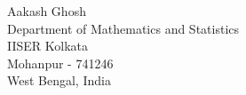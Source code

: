 \documentclass[a4paper, 10pt]{article}
\begin{document}
Aakash Ghosh\\
Department of Mathematics and Statistics\\
IISER Kolkata\\
Mohanpur - 741246\\
West Bengal, India
\end{document}
